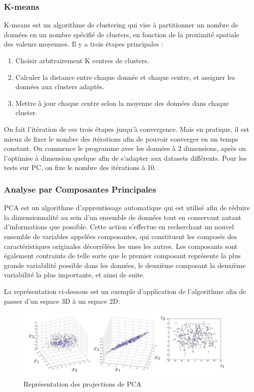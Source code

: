 \documentclass[12pt,a4paper]{ieee}
\begin{document}
\subsubsection{K-means}
K-means est un algorithme de clustering qui vise à partitionner un nombre de données en un nombre spécifié de clusters, en fonction de la proximité spatiale des valeurs moyennes. Il y a trois étapes principales :
\begin{enumerate}
\item Choisir arbitrairement K centres de clusters.
\item Calculer la distance entre chaque donnée et chaque centre, et assigner les données aux clusters adaptés.
\item Mettre à jour chaque centre selon la moyenne des données dans chaque cluster.
\end{enumerate}
On fait l’itération de ces trois étapes jusqu’à convergence. Mais en pratique, il est mieux de fixer le nombre des itérations afin de pouvoir converger en un temps constant. On commence le programme avec les données à 2 dimensions, après on l’optimise à dimension quelque afin de s’adapter aux datasets différents. Pour les tests sur PC, on fixe le nombre des itérations à 10.

\subsubsection{Analyse par Composantes Principales}
PCA est un algorithme d'apprentissage automatique qui est utilisé afin de réduire la dimensionnalité au sein d'un ensemble de données tout en conservant autant d'informations que possible. Cette action s'effectue en recherchant un nouvel ensemble de variables appelées composantes, qui constituent les composés des caractéristiques originales décorrélées les unes les autres. Les composants sont également contraints de telle sorte que le premier composant représente la plus grande variabilité possible dans les données, le deuxième composant la deuxième variabilité la plus importante, et ainsi de suite.

La représentation ci-dessous est un exemple d’application de l’algorithme afin de passer d’un espace 3D à un espace 2D:
\begin{figure}[H]
	\centering
	\includegraphics[width=0.8\linewidth]{soft/screenshot003}
	\caption{Représentation des projections de PCA}
	\label{fig:screenshot003}
\end{figure}
\end{document}
